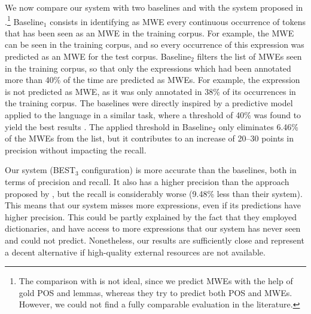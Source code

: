 \documentclass[output=paper,modfonts]{langscibook}
\begin{document}
We now compare our system with two baselines and with the system proposed in \citet{leroux:hal-01074298}.\footnote{The comparison with \citet{leroux:hal-01074298} is not ideal, since we predict MWEs with the help of gold POS and lemmas, whereas they try to predict both POS and MWEs. However, we could not find a fully comparable evaluation in the literature.} 
Baseline$_1$ consists in identifying as MWE every continuous occurrence of tokens that has been seen as an MWE in the training corpus. For example, the MWE  can be seen in the training corpus, and so every occurrence of this expression was predicted as an MWE for the test corpus.
Baseline$_2$ filters the list of MWEs seen in the training corpus, so that only the expressions which had been annotated more than 40\% of the time are predicted as MWEs. For example, the expression  is not predicted as MWE, as it was only annotated in $38\%$ of its occurrences in the training corpus. The baselines were directly inspired by a predictive model applied to the  language in a similar task, where a threshold of 40\% was found to yield the best results \citep{cordeiro-ramisch-villavicencio:2016:SemEval-dimsum}. The applied threshold in Baseline$_2$ only eliminates 6.46\% of the MWEs from the list, but it contributes to an increase of 20--30 points in precision without impacting the recall.


Our system (BEST$_3$ configuration) is more accurate than the baselines, both in terms of precision and recall. It also has a higher precision than the approach proposed by \citet{leroux:hal-01074298}, but the recall is considerably worse (9.48\% less than their system). This means that our system misses more expressions, even if its predictions have higher precision. This could be partly explained by the fact that they employed dictionaries, and have access to more expressions that our system has never seen and could not predict. 
Nonetheless, our results are sufficiently close and represent a decent alternative if high-quality external resources are not available.
\end{document}
